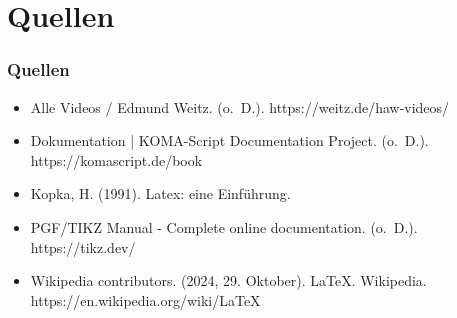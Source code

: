 \documentclass[aspectratio=169]{beamer}
\begin{document}
\section{Quellen}
\begin{frame}
  \frametitle{Quellen}
  \begin{itemize}
    \item Alle Videos / Edmund Weitz. (o. D.). https://weitz.de/haw-videos/ 
    \item Dokumentation | KOMA-Script Documentation Project. (o. D.). https://komascript.de/book 
    \item Kopka, H. (1991). Latex: eine Einführung. 
    \item PGF/TIKZ Manual - Complete online documentation. (o. D.). https://tikz.dev/ 
    \item Wikipedia contributors. (2024, 29. Oktober). LaTeX. Wikipedia. https://en.wikipedia.org/wiki/LaTeX
  \end{itemize}

\end{frame}

\end{document}
